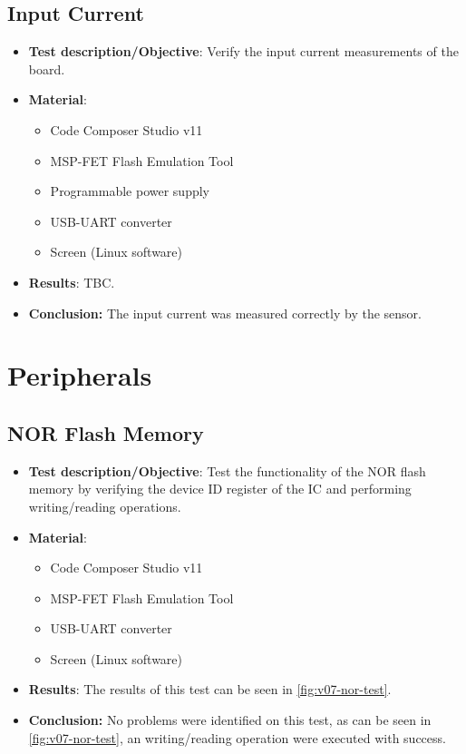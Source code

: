 \subsection{Input Current}

\begin{itemize}
    \item \textbf{Test description/Objective}: Verify the input current measurements of the board.
    \item \textbf{Material}:
        \begin{itemize}
            \item Code Composer Studio v11
            \item MSP-FET Flash Emulation Tool
            \item Programmable power supply
            \item USB-UART converter
            \item Screen (Linux software)
        \end{itemize}
    \item \textbf{Results}: TBC.
    \item \textbf{Conclusion:} The input current was measured correctly by the sensor.
\end{itemize}

\section{Peripherals}

\subsection{NOR Flash Memory}

\begin{itemize}
    \item \textbf{Test description/Objective}: Test the functionality of the NOR flash memory by verifying the device ID register of the IC and performing writing/reading operations.
    \item \textbf{Material}:
        \begin{itemize}
            \item Code Composer Studio v11
            \item MSP-FET Flash Emulation Tool
            \item USB-UART converter
            \item Screen (Linux software)
        \end{itemize}
    \item \textbf{Results}: The results of this test can be seen in \autoref{fig:v07-nor-test}.
    \item \textbf{Conclusion:} No problems were identified on this test, as can be seen in \autoref{fig:v07-nor-test}, an writing/reading operation were executed with success.
\end{itemize}

